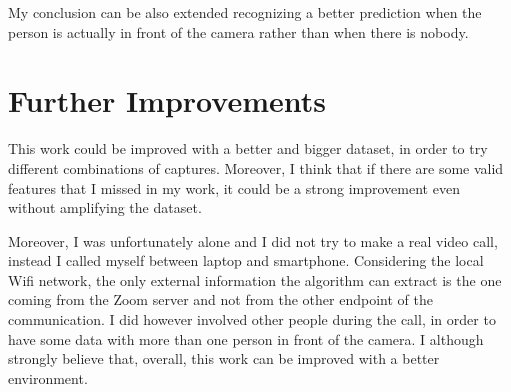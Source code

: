 \documentclass[12pt, conference]{IEEEtran}
\begin{document}
My conclusion can be also extended recognizing a better prediction when the person is actually in front of the camera rather than when there is nobody.

\section{Further Improvements}

This work could be improved with a better and bigger dataset, in order to try different combinations of captures. Moreover, I think that if there are some valid features that I missed in my work, it could be a strong improvement even without amplifying the dataset.

Moreover, I was unfortunately alone and I did not try to make a real video call, instead I called myself between laptop and smartphone. Considering the local Wifi network, the only external information the algorithm can extract is the one coming from the Zoom server and not from the other endpoint of the communication. I did however involved other people during the call, in order to have some data with more than one person in front of the camera. I although strongly believe that, overall, this work can be improved with a better environment.



\end{document}

